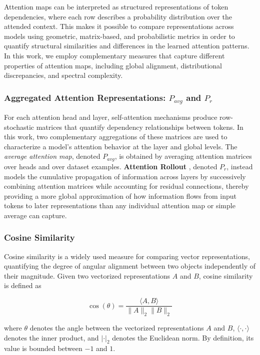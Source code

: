 \documentclass[conference]{IEEEtran}
\begin{document}
Attention maps can be interpreted as structured representations of token dependencies, where each row describes a probability distribution over the attended context. This makes it possible to compare representations across models using geometric, matrix-based, and probabilistic metrics in order to quantify structural similarities and differences in the learned attention patterns. In this work, we employ complementary measures that capture different properties of attention maps, including global alignment, distributional discrepancies, and spectral complexity.

\subsubsection{\texorpdfstring{Aggregated Attention Representations: $P_{avg}$ and $P_r$}{Aggregated Attention Representations: Pavg and Pr}}

For each attention head and layer, self-attention mechanisms produce row-stochastic matrices that quantify dependency relationships between tokens. In this work, two complementary aggregations of these matrices are used to characterize a model's attention behavior at the layer and global levels. The \textit{average attention map}, denoted $P_{avg}$, is obtained by averaging attention matrices over heads and over dataset examples. \textbf{Attention Rollout} \cite{abnar2020quantifying}, denoted $P_r$, instead models the cumulative propagation of information across layers by successively combining attention matrices while accounting for residual connections, thereby providing a more global approximation of how information flows from input tokens to later representations than any individual attention map or simple average can capture.

\subsubsection{Cosine Similarity}

Cosine similarity is a widely used measure for comparing vector representations, quantifying the degree of angular alignment between two objects independently of their magnitude. Given two vectorized representations $A$ and $B$, cosine similarity is defined as

\[
\cos(\theta)
=
\frac{
\langle A,B \rangle
}{
\|A\|_2 \|B\|_2
}
\]

where $\theta$ denotes the angle between the vectorized representations $A$ and $B$, $\langle \cdot,\cdot \rangle$ denotes the inner product, and $|\cdot|_2$ denotes the Euclidean norm. By definition, its value is bounded between $-1$ and $1$.
\end{document}
